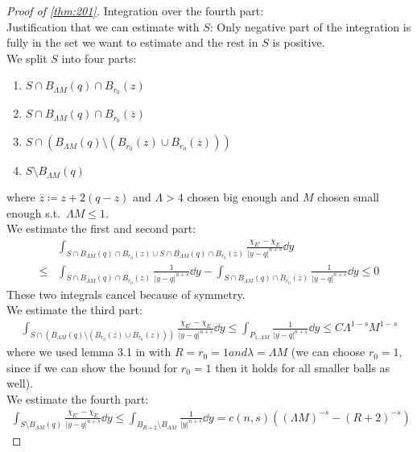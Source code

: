 \begin{proof}[Proof of \cref{thm:201}]
	Integration over the fourth part: \\
	Justification that we can estimate with \( S \): Only negative part of the integration
	is fully in the set we want to estimate and the rest in \( S \) is positive. \\
	We split \( S \) into four parts:
	\begin{enumerate}[label = \roman*)]
		\item \( S \cap B_{\Lambda M} (q) \cap B_{r_0}(z) \)
		\item \( S \cap B_{\Lambda M} (q) \cap B_{r_0}( \overline{z}) \)
		\item \( S \cap (B_{\Lambda M} (q)\setminus ( B_{r_0}(z) \cup
		      B_{r_0}(\overline{z}))) \)
		\item \( S \setminus B_{\Lambda M} (q) \)
	\end{enumerate}
	where \( \overline{z}\coloneqq z + 2(q-z) \) and \( \Lambda > 4 \) chosen big enough
	and \( M \) chosen small enough s.t.\ \( \Lambda M \leq 1 \). \\
	We estimate the first and second part:
	\begin{align*}
		     & \int_{S \cap B_{\Lambda M} (q) \cap B_{r_0}(z) \cup S \cap B_{\Lambda M} (q) \cap B_{r_0}(\overline{z})} \frac{\chi_{E^c}- \chi_E}{\lvert y-q\rvert^{n+s}} \dd{y} \\
		\leq & \int_{S \cap B_{\Lambda M} (q) \cap B_{r_0}(z)} \frac{1}{\lvert y-q\rvert^{n+s}} \dd{y} - \int_{S \cap B_{\Lambda M} (q) \cap B_{r_0}(\overline{z})} \frac{1}{\lvert y-q\rvert^{n+s}} \dd{y} \leq 0
	\end{align*}
	These two integrals cancel because of symmetry. \\
	We estimate the third part:
	\begin{gather*}
		\int_{S \cap (B_{\Lambda M} (q)\setminus ( B_{r_0}(z) \cup B_{r_0}(z)))}\frac{\chi_{E^c}- \chi_E}{\lvert y-q\rvert^{n+s}} \dd{y} \leq \int_{P_{1,\Lambda M}} \frac{1}{\lvert y-q\rvert^{n+s}} \dd{y} \leq C \Lambda^{1-s} M^{1-s}
	\end{gather*}
	where we used lemma 3.1 in \cite{Dipierro2016} with \( R = r_0 = 1 and \lambda =
	\Lambda M \) (we can choose \( r_0 = 1 \), since if we can show the bound for \( r_0 =
	1 \) then it holds for all smaller balls as well). \\
	We estimate the fourth part:
	\begin{gather*}
		\int_{S\setminus B_{\Lambda M} (q)} \frac{\chi_{E^c}- \chi_E}{\lvert y-q\rvert^{n+s}} \dd{y} \leq \int_{B_{R+2}\setminus B_{\Lambda M}} \frac{1}{\lvert y\rvert^{n+s}} \dd{y} = c(n,s)((\Lambda M)^{-s} - (R+2)^{-s})

\end{gather*}
\end{proof}
